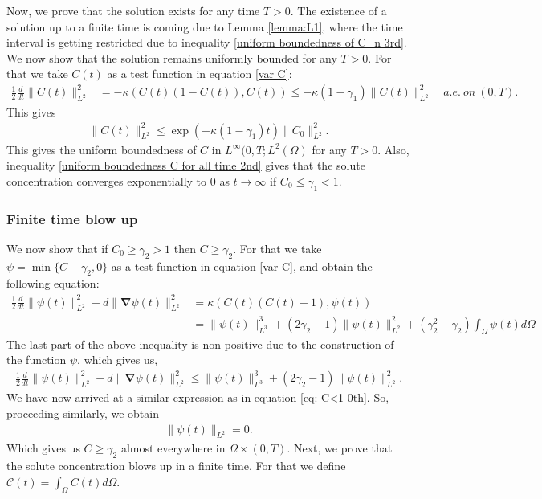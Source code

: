 \documentclass[final,3p,times]{elsarticle}
\theoremstyle{plain}
\theoremstyle{remark}
\theoremstyle{plain}
\theoremstyle{remark}
\begin{document}
Now, we prove that the solution exists for any time $T>0.$ The existence of a solution up to a finite time is coming due to Lemma \ref{lemma:L1}, where the time interval is getting restricted due to inequality \eqref{uniform boundedness of C_n 3rd}. 
We now show that the solution remains uniformly bounded for any $T>0$. For that we take $C(t)$ as a test function in equation \eqref{var C}:
	\begin{align}
    \frac{1}{2}\frac{d}{dt}\|C\left(t\right)\|_{L^2}^2&=- \kappa \left(C(t)\left(1-C(t)\right),C(t)\right) \le -\kappa\left(1 - \gamma_1\right)\|C(t)\|^2_{L^2} \quad a.e.\  on \ \left(0,T\right). \label{uniform boundedness C for all time 1st }
	\end{align}
    This gives
    \begin{align}
        \|C(t)\|^2_{L^2}\leq \exp{\left(-\kappa\left(1 - \gamma_1\right)t\right)}\|C_0\|^2_{L^2}.  \label{uniform boundedness C for all time 2nd}
    \end{align}
This gives the uniform boundedness of $C$ in $L^\infty(0,T;L^2(\Omega)$ for any $T>0.$ Also, inequality \eqref{uniform boundedness C for all time 2nd} gives that the solute concentration converges exponentially to $0$ as $t\to \infty$ if $C_0 \leq \gamma_1 < 1.$

\subsubsection{Finite time blow up}
We now show that if $C_0\geq \gamma_2 >1$ then $C\geq \gamma_2$. For that we take $\psi = \min\{C-\gamma_2,0\}$ as a test function in equation \eqref{var C}, and obtain the following equation:
\begin{align}
    \frac{1}{2}\frac{d}{dt}\|\psi(t)\|_{L^2}^2+d\|\boldsymbol\nabla \psi (t)\|_{L^2}^2 &= \kappa \left ( C (t) (C(t) -1), \psi(t)\right) \nonumber \\
    & = \|\psi(t)\|_{L^3}^3 + (2\gamma_2 - 1)\|\psi(t)\|_{L^2}^2 + (\gamma_2^2-\gamma_2)\int_\Omega \psi(t)d\Omega
\end{align}
The last part of the above inequality is non-positive due to the construction of the function $\psi$, which gives us,
\begin{align}
    \frac{1}{2}\frac{d}{dt}\|\psi(t)\|_{L^2}^2+d\|\boldsymbol\nabla \psi (t)\|_{L^2}^2 \leq \|\psi(t)\|_{L^3}^3 + (2\gamma_2 - 1)\|\psi(t)\|_{L^2}^2.
\end{align}
We have now arrived at a similar expression as in equation \eqref{eq: C<1 0th}. So, proceeding similarly, we obtain
\begin{align}
    \|\psi (t)\|_{L^2} = 0.
\end{align}
Which gives us $C\geq \gamma_2$ almost everywhere in $\Omega\times(0,T)$. 
Next, we prove that the solute concentration blows up in a finite time. For that we define $\mathscr C(t)= \int_\Omega C(t) d\Omega$. 
\end{document}
